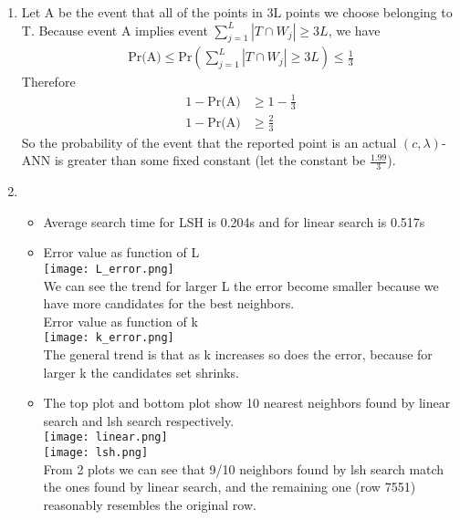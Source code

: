 \documentclass[12pt]{article}
\begin{document}
\begin{enumerate}[label=(\alph*)]
	\item
	Let A be the event that all of the points in 3L points we choose belonging to T. Because event A implies event $\sum_{j=1}^L|T \cap W_j| \geq 3L$, we have 
	\begin{align*}
		\text{Pr(A)} \leq \text{Pr}(\sum_{j=1}^L|T \cap W_j| \geq 3L) \leq \frac{1}{3}
	\end{align*}
	Therefore
	\begin{align*}
		1 - \text{Pr(A)} &\geq 1 - \frac{1}{3} \\
		1 - \text{Pr(A)} &\geq \frac{2}{3}
	\end{align*}
	So the probability of the event that the reported point is an actual $(c, \lambda)$-ANN is greater than some fixed constant (let the constant be $\frac{1.99}{3}$).

	\item 
	\begin{itemize}
		\item Average search time for LSH is 0.204s and for linear search is 0.517s
		\item Error value as function of L \\
		\texttt{[image: L\_error.png]} \\
		We can see the trend for larger L the error become smaller because we have more candidates for the best neighbors. \\
		Error value as function of k \\
		\texttt{[image: k\_error.png]} \\
		The general trend is that as k increases so does the error, because for larger k the candidates set shrinks.
		\item
		The top plot and bottom plot show 10 nearest neighbors found by linear search and lsh search respectively. \\
		\texttt{[image: linear.png]} \\ 
		\texttt{[image: lsh.png]} \\
		From 2 plots we can see that 9/10 neighbors found by lsh search match the ones found by linear search, and the remaining one (row 7551) reasonably resembles the original row.
	\end{itemize}
\end{enumerate}
\end{document}
